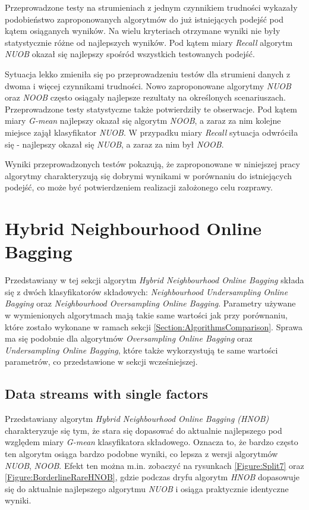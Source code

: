 Przeprowadzone testy na strumieniach z jednym czynnikiem trudności wykazały podobieństwo zaproponowanych algorytmów do już istniejących podejść pod kątem osiąganych wyników. Na wielu kryteriach otrzymane wyniki nie były statystycznie różne od najlepszych wyników. Pod kątem miary \textit{Recall} algorytm \textit{NUOB} okazał się najlepszy spośród wszystkich testowanych podejść.

Sytuacja lekko zmieniła się po przeprowadzeniu testów dla strumieni danych z dwoma i więcej czynnikami trudności. Nowo zaproponowane algorytmy \textit{NUOB} oraz \textit{NOOB} często osiągały najlepsze rezultaty na określonych scenariuszach. Przeprowadzone testy statystyczne także potwierdziły te obserwacje. Pod kątem miary \textit{G-mean} najlepszy okazał się algorytm \textit{NOOB}, a zaraz za nim kolejne miejsce zajął klasyfikator \textit{NUOB}. W przypadku miary \textit{Recall} sytuacja odwróciła się - najlepszy okazał się \textit{NUOB}, a zaraz za nim był \textit{NOOB}.

Wyniki przeprowadzonych testów pokazują, że zaproponowane w niniejszej pracy algorytmy charakteryzują się dobrymi wynikami w porównaniu do istniejących podejść, co może być potwierdzeniem realizacji założonego celu rozprawy.

\section{Hybrid Neighbourhood Online Bagging}

\noindent Przedstawiany w tej sekcji algorytm \textit{Hybrid Neighbourhood Online Bagging} składa się z dwóch klasyfikatorów składowych: \textit{Neighbourhood Undersampling Online Bagging} oraz \textit{Neighbourhood Oversampling Online Bagging}. Parametry używane w wymienionych algorytmach mają takie same wartości jak przy porównaniu, które zostało wykonane w ramach sekcji \ref{Section:AlgorithmsComparison}. Sprawa ma się podobnie dla algorytmów \textit{Oversampling Online Bagging} oraz \textit{Undersampling Online Bagging}, które także wykorzystują te same wartości parametrów, co przedstawione w sekcji wcześniejszej.

\subsection{Data streams with single factors}

\noindent Przedstawiany algorytm \textit{Hybrid Neighbourhood Online Bagging (HNOB)} charakteryzuje się tym, że stara się dopasować do aktualnie najlepszego pod względem miary \textit{G-mean} klasyfikatora składowego. Oznacza to, że bardzo często ten algorytm osiąga bardzo podobne wyniki, co lepsza z wersji algorytmów \textit{NUOB}, \textit{NOOB}. Efekt ten można m.in. zobaczyć na rysunkach \ref{Figure:Split7} oraz \ref{Figure:BorderlineRareHNOB}, gdzie podczas dryfu algorytm \textit{HNOB} dopasowuje się do aktualnie najlepszego algorytmu \textit{NUOB} i osiąga praktycznie identyczne wyniki.

